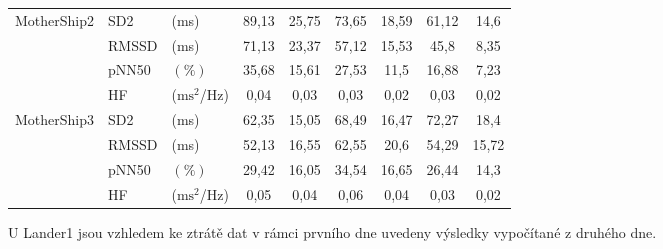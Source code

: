 \begin{table}[!htb]
\begin{threeparttable}
\begin{tabular*}{\linewidth}{@{\extracolsep{\fill}} lllcccccc @{}}
            \multirow[t]{4}{*}{MotherShip2} & SD2                                  & (ms)                                & 89,13                               & 25,75                               & 73,65           & 18,59       & 61,12           & 14,6        \\
            & RMSSD                                 & (ms)                                & 71,13                               & 23,37                               & 57,12           & 15,53       & 45,8            & 8,35        \\
            & pNN50                                 & $(\%)$                              & 35,68                               & 15,61                               & 27,53           & 11,5        & 16,88           & 7,23        \\
            & HF                                    & ($\text{ms}^2$/Hz)                  & 0,04                                & 0,03                                & 0,03            & 0,02        & 0,03            & 0,02        \\ \midrule
            \multirow[t]{4}{*}{MotherShip3} & SD2                                  & (ms)                                & 62,35                               & 15,05                               & 68,49           & 16,47       & 72,27           & 18,4        \\
            & RMSSD                                 & (ms)                                & 52,13                               & 16,55                               & 62,55           & 20,6        & 54,29           & 15,72       \\
            & pNN50                                 & $(\%)$                              & 29,42                               & 16,05                               & 34,54           & 16,65       & 26,44           & 14,3        \\
            & HF                                    & ($\text{ms}^2$/Hz)                  & 0,05                                & 0,04                                & 0,06            & 0,04        & 0,03            & 0,02        \\
            \bottomrule
        \end{tabular*}
        \begin{tablenotes}
            \small
            \item U Lander1 jsou vzhledem ke ztrátě dat v rámci prvního dne
            uvedeny výsledky vypočítané z druhého dne.
        \end{tablenotes}
    \end{threeparttable}
    \label{tab:daily_params}
\end{table}

